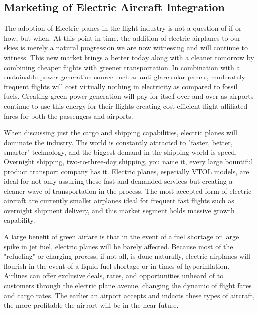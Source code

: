 \documentclass[../main.tex]{subfiles}
\begin{document}
\subsection{Marketing of Electric Aircraft Integration} %
The adoption of Electric planes in the flight industry is not a question of if or how, but when. At this point in time, the addition of electric airplanes to our skies is merely a natural progression we are now witnessing and will continue to witness. This new market brings a better today along with a cleaner tomorrow by combining cheaper flights with greener transportation. In combination with a sustainable power generation source such as anti-glare solar panels, moderately frequent flights will cost virtually nothing in electricity as compared to fossil fuels. Creating green power generation will pay for itself over and over as airports continue to use this energy for their flights creating cost efficient flight affiliated fares for both the passengers and airports.\par
When discussing just the cargo and shipping capabilities, electric planes will dominate the industry. The world is constantly attracted to "faster, better, smarter" technology, and the biggest demand in the shipping world is speed. Overnight shipping, two-to-three-day shipping, you name it, every large bountiful product transport company has it. Electric planes, especially VTOL models, are ideal for not only assuring these fast and demanded services but creating a cleaner wave of transportation in the process. The most accepted form of electric aircraft are currently smaller airplanes ideal for frequent fast flights such as overnight shipment delivery, and this market segment holds massive growth capability.\par
A large benefit of green airfare is that in the event of a fuel shortage or large spike in jet fuel, electric planes will be barely affected. Because most of the "refueling" or charging process, if not all, is done naturally, electric airplanes will flourish in the event of a liquid fuel shortage or in times of hyperinflation. Airlines can offer exclusive deals, rates, and opportunities unheard of to customers through the electric plane avenue, changing the dynamic of flight fares and cargo rates.  The earlier an airport accepts and inducts these types of aircraft, the more profitable the airport will be in the near future.\par 
\newpage
\end{document}
